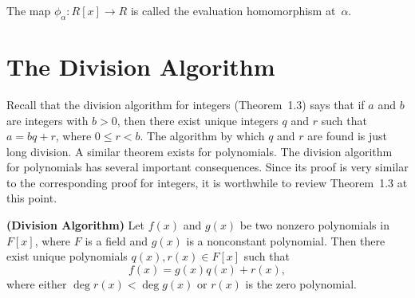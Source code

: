 \medskip

The map  $\phi_{\alpha} : R[x] \rightarrow R$ is called the {\bfi evaluation homomorphism\/} at~$\alpha$. 
 

\section{The Division Algorithm}

Recall that the division algorithm for integers (Theorem~1.3) says
that if $a$ and $b$ are integers with $b>0$, then there exist unique
integers $q$ and $r$ such that $a = bq+r$, where $0 \leq r < b$. The
algorithm by which $q$ and $r$ are found is just long division.  A
similar theorem exists for polynomials.	The division algorithm for
polynomials has several important consequences. Since its proof is
very similar to the corresponding proof for integers, it is worthwhile
to review Theorem~1.3 at this point.  
 
 
\begin{theorem} 
{\bf (Division Algorithm)} Let $f(x)$ and $g(x)$ be two
nonzero polynomials in $F[x]$, where $F$ is a field and  $g(x)$ is a
nonconstant polynomial.  Then there exist unique polynomials $q(x),
r(x) \in F[x]$ such that 
$$
f(x) = g(x) q(x) + r(x),
$$
where either  $\deg r(x) < \deg g(x)$ or $r(x)$ is the zero
polynomial. 
\end{theorem}
 
